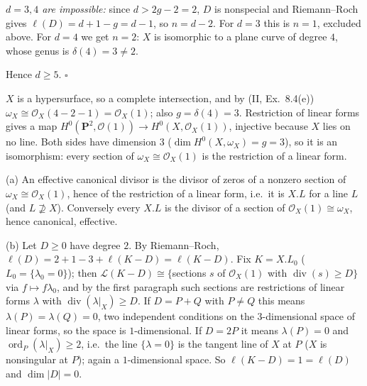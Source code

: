 \documentclass[11pt]{article}
\begin{document}
\emph{$d=3,4$ are impossible:} since $d>2g-2=2$, $D$ is nonspecial and Riemann--Roch gives $\ell(D)=d+1-g=d-1$, so $n=d-2$. For $d=3$ this is $n=1$, excluded above. For $d=4$ we get $n=2$: $X$ is isomorphic to a plane curve of degree $4$, whose genus is $\delta(4)=3\ne2$.

Hence $d\ge5$. \hfill$\square$

\pf
$X$ is a hypersurface, so a complete intersection, and by (II, Ex.~8.4(e)) $\omega_X\cong\mathcal O_X(4-2-1)=\mathcal O_X(1)$; also $g=\delta(4)=3$. Restriction of linear forms gives a map $H^0(\mathbf P^2,\mathcal O(1))\to H^0(X,\mathcal O_X(1))$, injective because $X$ lies on no line. Both sides have dimension $3$ ($\dim H^0(X,\omega_X)=g=3$), so it is an isomorphism: every section of $\omega_X\cong\mathcal O_X(1)$ is the restriction of a linear form.

(a) An effective canonical divisor is the divisor of zeros of a nonzero section of $\omega_X\cong\mathcal O_X(1)$, hence of the restriction of a linear form, i.e.\ it is $X.L$ for a line $L$ (and $L\not\supseteq X$). Conversely every $X.L$ is the divisor of a section of $\mathcal O_X(1)\cong\omega_X$, hence canonical, effective.

(b) Let $D\ge0$ have degree $2$. By Riemann--Roch, $\ell(D)=2+1-3+\ell(K-D)=\ell(K-D)$. Fix $K=X.L_0$ ($L_0=\{\lambda_0=0\}$); then $\mathcal L(K-D)\cong\{$sections $s$ of $\mathcal O_X(1)$ with $\operatorname{div}(s)\ge D\}$ via $f\mapsto f\lambda_0$, and by the first paragraph such sections are restrictions of linear forms $\lambda$ with $\operatorname{div}(\lambda|_X)\ge D$. If $D=P+Q$ with $P\ne Q$ this means $\lambda(P)=\lambda(Q)=0$, two independent conditions on the $3$-dimensional space of linear forms, so the space is $1$-dimensional. If $D=2P$ it means $\lambda(P)=0$ and $\operatorname{ord}_P(\lambda|_X)\ge2$, i.e.\ the line $\{\lambda=0\}$ is the tangent line of $X$ at $P$ ($X$ is nonsingular at $P$); again a $1$-dimensional space. So $\ell(K-D)=1=\ell(D)$ and $\dim|D|=0$.
\end{document}
